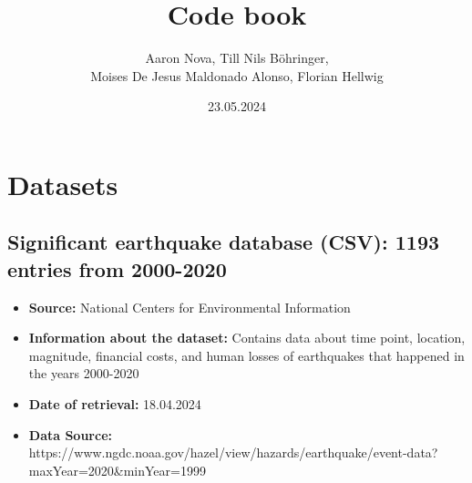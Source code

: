 \documentclass[a4paper]{article}
\title{Code book}
\author{Aaron Nova, Till Nils Böhringer, \\ 
Moises De Jesus Maldonado Alonso, Florian Hellwig}
\date{23.05.2024}
\begin{document}
\maketitle

\section{Datasets}

\subsection{Significant earthquake database (CSV): 1193 entries from 2000-2020}
\begin{itemize}
\item \textbf{Source:} National Centers for
Environmental Information
\item \textbf{Information about the dataset:} Contains data about time point, location, magnitude, financial costs, and human losses of earthquakes that happened in the years 2000-2020
\item \textbf{Date of retrieval:} 18.04.2024
\item \textbf{Data Source:} https://www.ngdc.noaa.gov/hazel/view/hazards/earthquake/event-data?maxYear=2020\&minYear=1999
\end{itemize}

\end{document}
